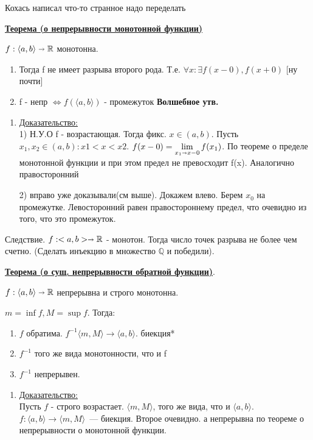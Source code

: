 \documentclass{article}
\newcommand{\thmm}[1]{\underline{\textbf{#1}}}
\newcommand{\prooff}[1]{{\underline{Доказательство:}} \\ }
\begin{document}
Кохась написал что-то странное надо переделать


\thmm{Теорема (о непрерывности монотонной функции)}

$f: \langle a,b\rangle \shortrightarrow \mathbb{R}$ монотонна. 

\begin{enumerate}
    \item Тогда f не имеет разрыва второго рода.
     Т.е. $\forall x: \exists f(x-0), f(x+0)$ [ну почти]
     \item f - непр $\Leftrightarrow f(\langle a,b\rangle)$ - промежуток \textbf{Волшебное утв.}
\end{enumerate}

\begin{enumerate}
    \item[] \prooff{}
   1) Н.У.О f - возрастающая. Тогда фикс. $x\in (a,b)$. Пусть $x_1,x_2\in (a,b): x1<x<x2$. $f(x-0)=\lim\limits_{x_1\shortrightarrow x-0} f(x_1)$. По теореме о пределе монотонной функции и при этом предел не превосходит f(x). Аналогично правосторонний

   2) вправо уже доказывали(см выше). Докажем влево. Берем $x_0$ на промежутке. Левосторонний равен правостороннему предел, что очевидно из того, что это промежуток.   
\end{enumerate}

Следствие. $f:<a,b> \shortrightarrow \mathbb{R}$ - монотон.
Тогда число точек разрыва не более чем счетно. (Сделать инъекцию в множество $\mathbb{Q}$ и победили).

\thmm{Теорема (о сущ. непрерывности обратной функции)}.

$f: \langle a,b \rangle \shortrightarrow \mathbb{R}$ непрерывна и строго монотонна.

$m = \inf f, M = \sup f$. Тогда:

\begin{enumerate}
    \item $f$ обратима. $f^{-1} \langle m,M\rangle \rightarrow \langle a,b \rangle$. биекция*
    \item $f^{-1}$ того же вида монотонности, что и f
    \item $f^{-1}$ непрерывен.
\end{enumerate}

\begin{enumerate}
    \item[] \prooff{}
    Пусть $f$ - строго возрастает. $\langle m, M\rangle $, того же вида, что и $\langle a, b \rangle $. $f: \langle a,b \rangle \rightarrow \langle m ,M \rangle $~--- биекция. Второе очевидно. а непрерывна по теореме о непрерывности о монотонной функции. 
\end{enumerate}
\end{document}

